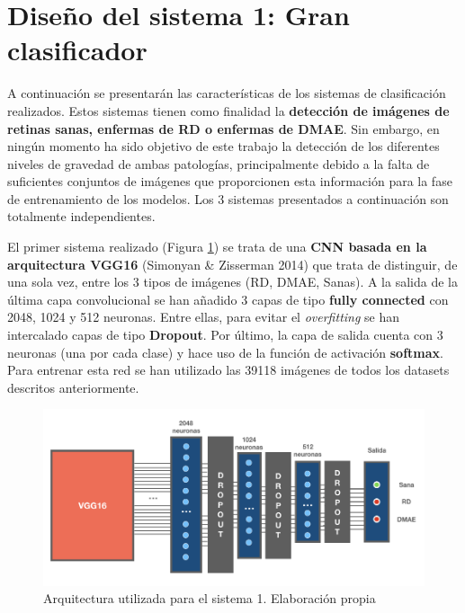 \documentclass[
  12pt,
  spanish,
  a4paperpaper,
]{report}
\begin{document}
\newpage

\hypertarget{diseuxf1o-del-sistema-1-gran-clasificador}{%
\section{Diseño del sistema 1: Gran
clasificador}\label{diseuxf1o-del-sistema-1-gran-clasificador}}

A continuación se presentarán las características de los sistemas de
clasificación realizados. Estos sistemas tienen como finalidad la
\textbf{detección de imágenes de retinas sanas, enfermas de RD o
enfermas de DMAE}. Sin embargo, en ningún momento ha sido objetivo de
este trabajo la detección de los diferentes niveles de gravedad de ambas
patologías, principalmente debido a la falta de suficientes conjuntos de
imágenes que proporcionen esta información para la fase de entrenamiento
de los modelos. Los 3 sistemas presentados a continuación son totalmente
independientes.

El primer sistema realizado (Figura \ref{des1}) se trata de una
\textbf{CNN basada en la arquitectura VGG16} (Simonyan \& Zisserman
2014) que trata de distinguir, de una sola vez, entre los 3 tipos de
imágenes (RD, DMAE, Sanas). A la salida de la última capa convolucional
se han añadido 3 capas de tipo \textbf{fully connected} con 2048, 1024 y
512 neuronas. Entre ellas, para evitar el \emph{overfitting} se han
intercalado capas de tipo \textbf{Dropout}. Por último, la capa de
salida cuenta con 3 neuronas (una por cada clase) y hace uso de la
función de activación \textbf{softmax}. Para entrenar esta red se han
utilizado las 39118 imágenes de todos los datasets descritos
anteriormente.

\begin{figure}
\centering
\includegraphics[width=1\textwidth,height=\textheight]{source/figures/design1_ar.png}
\caption{Arquitectura utilizada para el sistema 1. Elaboración propia
\label{des1}}
\end{figure}
\end{document}
